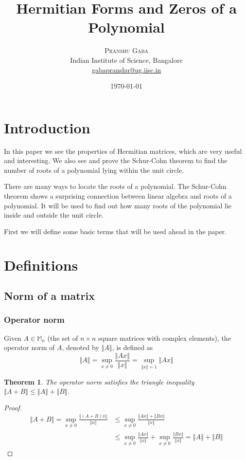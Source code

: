 \documentclass[twofold]{article}
\author{%
\textsc{Pranshu Gaba}  \\[1ex]
\normalsize Indian Institute of Science, Bangalore \\
\normalsize \href{mailto:gabapranshu@iisc.ac.in}{gabapranshu@ug.iisc.in}}
\title{Hermitian Forms and Zeros of a Polynomial}
\date{\today}
\newcommand*\norm[1]{\left \Vert #1 \right\Vert}
\theoremstyle{plain}
\newtheorem{theorem}{Theorem}
\theoremstyle{definition}
\theoremstyle{remark}
\begin{document}
\maketitle

\section{Introduction}


In this paper we see the properties of Hermitian matrices, which are very useful and interesting. We also see and prove the Schur-Cohn theorem to find the number of roots of a polynomial lying within the unit circle. 

There are many ways to locate the roots of a polynomial. The Schur-Cohn theorem shows a surprising connection between linear algebra and roots of a polynomial. It will be used to find out how many roots of the polynomial lie inside and outside the unit circle.

First we will define some basic terms that will be used ahead in the paper.

\section{Definitions}



\subsection{Norm of a matrix}

\subsubsection{Operator norm}
Given \(A \in \mathbb{M}_n\) (the set of \(n \times n\) square matrices with complex elements), the operator norm of \(A\), denoted by \(\norm{A}\), is defined as \[\norm{A} =\displaystyle \sup _{x \neq 0} \frac{\norm{Ax}}{\norm{x}} = \sup_{\norm{x} = 1} \norm{Ax} \]

\begin{theorem} The operator norm satisfies the triangle inequality \(\norm{A + B} \leq \norm{A} + \norm{B}\). \end{theorem}
\begin{proof} \begin{equation*} \begin{split}
\norm{A + B}  = \sup _{x \ne 0} \frac{\norm{(A + B) x}}{\norm{x}} & \le \sup_{x \ne 0} \frac{\norm{Ax} +\norm{Bx}}{\norm{x}} \\
& \le \sup_{x \ne 0} \frac{\norm{Ax}}{\norm{x}} + \sup_{x \ne 0} \frac{\norm{Bx}}{\norm{x}} = \norm{A} + \norm{B}
\end{split} \end{equation*} \end{proof}
\end{document}
